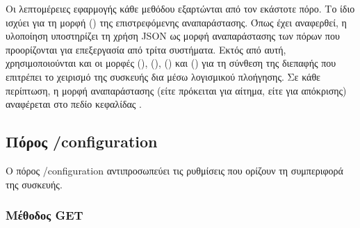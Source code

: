 Οι λεπτομέρειες εφαρμογής κάθε μεθόδου εξαρτώνται από τον εκάστοτε πόρο. Το ίδιο
ισχύει για τη μορφή () της επιστρεφόμενης αναπαράστασης. Όπως
έχει αναφερθεί, η υλοποίηση υποστηρίζει τη χρήση JSON ως μορφή αναπαράστασης των
πόρων που προορίζονται για επεξεργασία από τρίτα συστήματα. Εκτός από αυτή,
χρησιμοποιούνται και οι μορφές (), (),
() και () για τη σύνθεση της
διεπαφής που επιτρέπει το χειρισμό της συσκευής δια μέσω λογισμικού πλοήγησης.
Σε κάθε περίπτωση, η μορφή αναπαράστασης (είτε πρόκειται για αίτημα, είτε για
απόκρισης) αναφέρεται στο πεδίο κεφαλίδας 
\parencite[124]{rfc2616}.


\subsection{Πόρος /configuration}
\label{subsec:network:config}

Ο πόρος /configuration αντιπροσωπεύει τις ρυθμίσεις που ορίζουν τη συμπεριφορά
της συσκευής.


\subsubsection{Μέθοδος GET}
\label{ssubsec:network:config-get}

